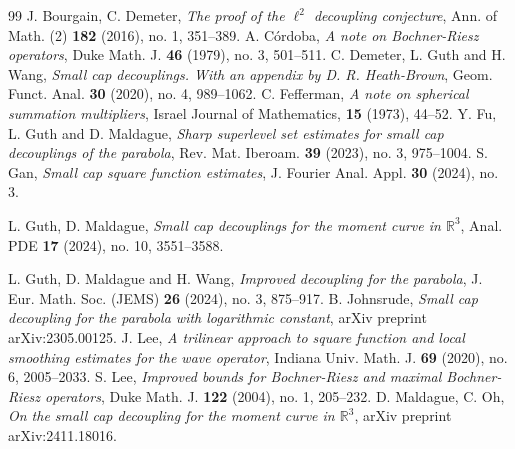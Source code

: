 \documentclass[reqno,centertags,11pt,a4paper]{amsart}
\begin{document}
\begin{thebibliography}{99}	
 J. Bourgain, C. Demeter, \textit{The proof of the $\ell^2$ decoupling conjecture}, Ann. of Math. (2) \textbf{182} (2016), no. 1, 351--389.	
 A.  C\'{o}rdoba, \textit{A note on Bochner-Riesz operators},  Duke Math. J. \textbf{46} (1979), no. 3, 501--511.
 C. Demeter, L. Guth and H. Wang, \textit{Small cap decouplings. With an appendix by D. R. Heath-Brown}, Geom. Funct. Anal. \textbf{30} (2020), no. 4, 989--1062.
 C. Fefferman, \textit{A note on spherical summation multipliers},  Israel Journal of Mathematics, \textbf{15} (1973), 44--52.
 Y. Fu, L. Guth and D. Maldague, \textit{Sharp superlevel set estimates for small cap decouplings of the parabola}, Rev. Mat. Iberoam.  \textbf{39} (2023), no. 3, 975--1004.
 S. Gan, \textit{Small cap square function estimates},  J. Fourier Anal. Appl. \textbf{30} (2024), no. 3.

 L. Guth, D. Maldague, \textit{Small cap decouplings for the moment curve in $\mathbb{R}^3$}, Anal. PDE \textbf{17} (2024), no. 10, 3551--3588.

 L. Guth, D. Maldague and H. Wang, \textit{Improved decoupling for the parabola},  J. Eur. Math. Soc. (JEMS)  \textbf{26} (2024), no. 3, 875--917.
 B. Johnsrude, \textit{Small cap decoupling for the parabola with logarithmic constant}, arXiv preprint arXiv:2305.00125.
 J. Lee, \textit{A trilinear approach to square function and local smoothing estimates for the wave operator},  Indiana Univ. Math. J.
\textbf{69} (2020), no. 6, 2005--2033.
 S. Lee, \textit{Improved bounds for Bochner-Riesz and maximal Bochner-Riesz operators}, Duke Math. J.
\textbf{122} (2004), no. 1, 205--232.
 D. Maldague, C. Oh, \textit{On the small cap decoupling for the moment curve in $\mathbb{R}^3$}, arXiv preprint arXiv:2411.18016.

\end{thebibliography}
\end{document}

